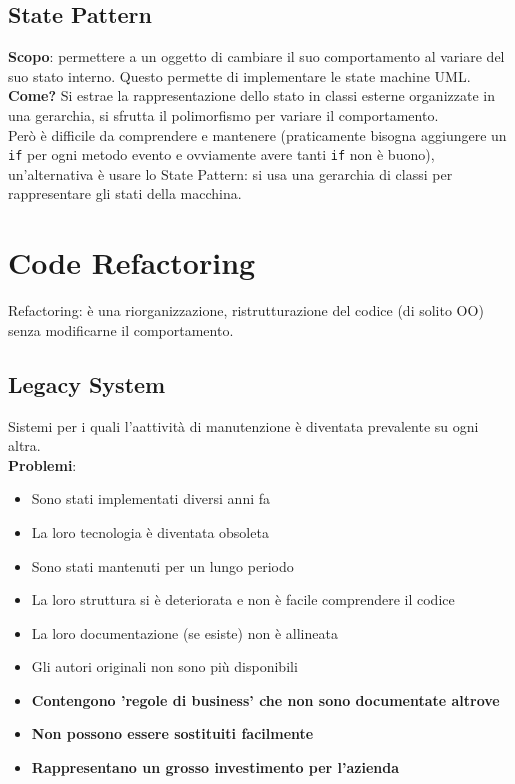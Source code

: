 \documentclass[12pt, a4paper]{report}
\begin{document}
\section{State Pattern}
\textbf{Scopo}: permettere a un oggetto di cambiare il suo comportamento al variare del suo stato interno. Questo permette di implementare le state machine UML.\\
\textbf{Come?} Si estrae la rappresentazione dello stato in classi esterne organizzate in una gerarchia, si sfrutta il polimorfismo per variare il comportamento.\\
Però è difficile da comprendere e mantenere (praticamente bisogna aggiungere un \texttt{if} per ogni metodo evento e ovviamente avere tanti \texttt{if} non è buono), un'alternativa è usare lo State Pattern: si usa una gerarchia di classi per rappresentare gli stati della macchina.
\chapter{Code Refactoring}
Refactoring: è una riorganizzazione, ristrutturazione del codice (di solito OO) senza modificarne il comportamento.
\section{Legacy System}
Sistemi per i quali l'aattività di manutenzione è diventata prevalente su ogni altra.\\
\textbf{Problemi}:
\begin{itemize}
    \item Sono stati implementati diversi anni fa
    \item La loro tecnologia è diventata obsoleta
    \item Sono stati mantenuti per un lungo periodo
    \item La loro struttura si è deteriorata e non è facile comprendere il codice
    \item La loro documentazione (se esiste) non è allineata
    \item Gli autori originali non sono più disponibili
    \item \textbf{Contengono 'regole di business' che non sono documentate altrove}
    \item \textbf{Non possono essere sostituiti facilmente}
    \item \textbf{Rappresentano un grosso investimento per l'azienda}
\end{itemize}
\end{document}
